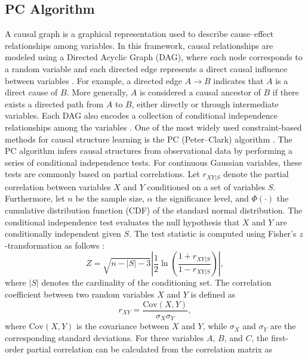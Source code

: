 \documentclass[review,12pt]{elsarticle}
\begin{document}
\subsection{PC Algorithm}
A causal graph is a graphical representation used to describe cause--effect relationships among variables. In this framework, causal relationships are modeled using a Directed Acyclic Graph (DAG), where each node corresponds to a random variable and each directed edge represents a direct causal influence between variables \cite{spirtes2000causation,pearl2009causality,kalisch2007estimating}.
For example, a directed edge $A \rightarrow B$ indicates that $A$ is a direct cause of $B$. More generally, $A$ is considered a causal ancestor of $B$ if there exists a directed path from $A$ to $B$, either directly or through intermediate variables. Each DAG also encodes a collection of conditional independence relationships among the variables \cite{pearl2009causality}.
One of the most widely used constraint-based methods for causal structure learning is the PC (Peter--Clark) algorithm \cite{spirtes2000causation}. The PC algorithm infers causal structures from observational data by performing a series of conditional independence tests. For continuous Gaussian variables, these tests are commonly based on partial correlations.
Let $r_{XY|S}$ denote the partial correlation between variables $X$ and $Y$ conditioned on a set of variables $S$. Furthermore, let $n$ be the sample size, $\alpha$ the significance level, and $\Phi(\cdot)$ the cumulative distribution function (CDF) of the standard normal distribution. The conditional independence test evaluates the null hypothesis that $X$ and $Y$ are conditionally independent given $S$. The test statistic is computed using Fisher's $z$-transformation as follows \cite{fisher1924distribution}:
\begin{equation}
Z = \sqrt{n-|S|-3}
\left|
\frac{1}{2}
\ln
\left(
\frac{1+r_{XY|S}}
     {1-r_{XY|S}}
\right)
\right|,
\label{eq:fisher_z}
\end{equation}
where $|S|$ denotes the cardinality of the conditioning set.
The correlation coefficient between two random variables $X$ and $Y$ is defined as
\begin{equation}
r_{XY}
=
\frac{\mathrm{Cov}(X,Y)}
{\sigma_X \sigma_Y},
\label{eq:corrcoef}
\end{equation}
where $\mathrm{Cov}(X,Y)$ is the covariance between $X$ and $Y$, while $\sigma_X$ and $\sigma_Y$ are the corresponding standard deviations.
For three variables $A$, $B$, and $C$, the first-order partial correlation can be calculated from the correlation matrix as
\end{document}

